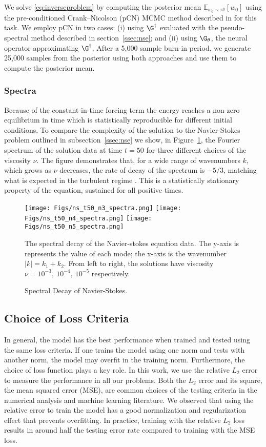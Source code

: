 We solve \eqref{eq:inverseproblem} by computing the posterior mean \(\mathbb{E}_{w_0 \sim \pi^y} [w_0]\) using the pre-conditioned Crank–Nicolson (pCN) MCMC method described in \cite{Cotter_2013} for this task. We employ pCN in two cases: (i) using \(\G^\dagger\) evaluated with the pseudo-spectral method described in section~\ref{ssec:nse}; and (ii)
using \(\G_\theta\), the neural operator approximating \(\G^\dagger\). After a 5,000 sample burn-in period, we generate 25,000 samples from the posterior using both approaches and use them to compute the posterior mean. 



\subsubsection{Spectra}
\label{app:sepctral}
Because of the constant-in-time forcing term the energy reaches
a non-zero equilibrium in time which is statistically
reproducible for different initial conditions.
To compare the complexity  of the solution to the Navier-Stokes problem outlined in subsection~\ref{ssec:nse} we show, 
in Figure~\ref{fig:spectral1}, the Fourier spectrum of the solution data at time \(t=50\) for three different choices of the viscosity \(\nu\). The figure demonstrates that, for a wide range of wavenumbers $k$, which grows as $\nu$ decreases, the rate of decay of the spectrum is \(-5/3\), matching what is expected in the turbulent regime \citep{kraichnan67inertial}. 
This is a statistically stationary property of the equation, sustained for all positive times.


\begin{figure}[h]
    \centering
    \texttt{[image: Figs/ns\_t50\_n3\_spectra.png]}
    \texttt{[image: Figs/ns\_t50\_n4\_spectra.png]}
    \texttt{[image: Figs/ns\_t50\_n5\_spectra.png]}
    \caption{Spectral Decay of Navier-Stokes.}
    \label{fig:spectral1}
    \small{ The spectral decay of the Navier-stokes equation data. The y-axis is represents the value of each mode; the x-axis is the wavenumber $|k| = k_1 + k_2$. From left to right, the solutions have viscosity \(\nu = 10^{-3}, \: 10^{-4}, \: 10^{-5}\) respectively.}
\end{figure}

\subsection{Choice of Loss Criteria}
In general, the model has the best performance when trained and tested using the same loss criteria. If one trains the model using one norm and tests with another norm, the model may overfit in the training norm. Furthermore, the choice of loss function plays a key role.
In this work, we use the relative $L_2$ error to measure the performance in all our problems. Both the $L_2$ error and its square, the mean squared error (MSE), are common choices of the testing criteria in the numerical analysis and machine learning literature. We observed that using the relative error to train the model has a good normalization and regularization effect that prevents overfitting. In practice, training with the relative $L_2$ loss results in around half the testing error rate compared to training with the MSE loss.